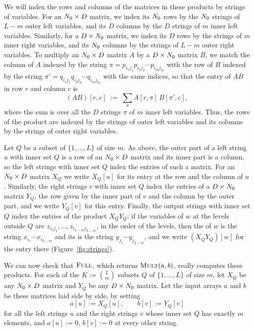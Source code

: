 We will index the rows and columns of the matrices in these products by strings of variables. For an $N_0\times D$ matrix, we index its $N_0$ rows by the $N_0$ strings of $L-m$ outer left variables, and its $D$ columns by the $D$ strings of $m$ inner left variables. Similarly, for a $D\times N_0$ matrix, we index its $D$ rows by the strings of $m$ inner right variables, and its $N_0$ columns by the strings of $L-m$ outer right variables. To multiply an $N_0\times D$ matrix $A$ by a $D\times N_0$ matrix $B$, we match the column of $A$ indexed by the string $\pi=p_{i_1j_1}p_{i_2j_2}\cdots p_{i_mj_m}$ with the row of $B$ indexed by the string $\pi'=q_{i_1j_1}q_{i_2j_2}\cdots q_{i_mj_m}$ with the same indices, so that the entry of $AB$ in row $r$ and column $c$ is
\[
(AB)[r,c]\;:=\;\sum_{\pi}A[r,\pi]\,B[\pi',c],
\]
where the sum is over all the $D$ strings $\pi$ of $m$ inner left variables. Thus, the rows of the product are indexed by the strings of outer left variables and its columns by the strings of outer right variables.

Let $Q$ be a subset of $\{1,\dots,L\}$ of size $m$. As above, the outer part of a left string $u$ with inner set $Q$ is a row of an $N_0\times D$ matrix and its inner part is a column, so the left strings with inner set $Q$ index the entries of such a matrix. For an $N_0\times D$ matrix $X_Q$ we write $X_Q[u]$ for its entry at the row and the column of $u$. Similarly, the right strings $v$ with inner set $Q$ index the entries of a $D\times N_0$ matrix $Y_Q$, the row given by the inner part of $v$ and the column by the outer part, and we write $Y_Q[v]$ for this entry. Finally, the output strings with inner set $Q$ index the entries of the product $X_QY_Q$: if the variables of $w$ at the levels outside $Q$ are $z_{i_1j_1},\dots,z_{i_{L-m}j_{L-m}}$, in the order of the levels, then the  of $w$ is the string $x_{i_1}\cdots x_{i_{L-m}}$ and its  is the string $y_{j_1}\cdots y_{j_{L-m}}$, and we write $(X_QY_Q)[w]$ for the entry there (Figure~\ref{fig:strings}).

We can now check that $\textnormal{\textsc{Full}}$, which returns $\textnormal{\textsc{Mult}}(a,b)$, really computes these products. For each of the $K:=\binom Lm$ subsets $Q$ of $\{1,\dots,L\}$ of size $m$, let $X_Q$ be any $N_0\times D$ matrix and $Y_Q$ be any $D\times N_0$ matrix. Let the input arrays $a$ and $b$ be these matrices laid side by side, by setting
\[
a[u]:=X_Q[u],\qquad b[v]:=Y_Q[v]
\]
for all the left strings $u$ and the right strings $v$ whose inner set $Q$ has exactly $m$ elements, and $a[u]:=0$, $b[v]:=0$ at every other string.

